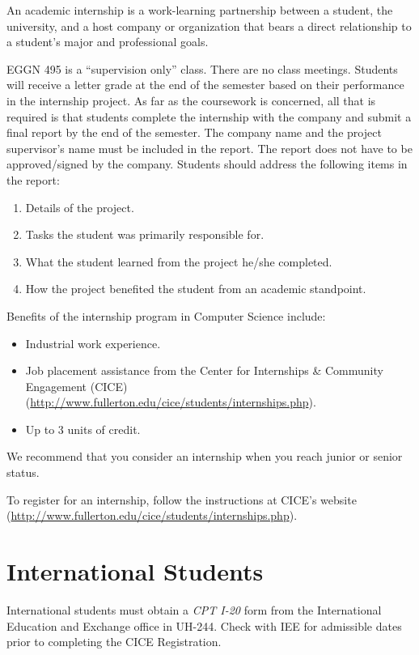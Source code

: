 \documentclass{book}
\begin{document}
An academic internship is a work-learning partnership between a student, the university, and a host company or organization that bears a direct relationship to a student’s major and professional goals.

EGGN 495 is a ``supervision only'' class. There are no class meetings. Students will receive a letter grade at the end of the semester based on their performance in the internship project. As far as the coursework is concerned, all that is required is that students complete the internship with the company and submit a final report by the end of the semester. The company name and the project supervisor's name must be included in the report. The report does not have to be approved/signed by the company. Students should address the following items in the report:
\begin{enumerate}
\item Details of the project.
\item Tasks the student was primarily responsible for.
\item What the student learned from the project he/she completed.
\item How the project benefited the student from an academic standpoint.
\end{enumerate}

Benefits of the internship program in Computer Science include:
\begin{itemize}
\item Industrial work experience.
\item Job placement assistance from the Center for Internships \& Community Engagement (CICE) (\url{http://www.fullerton.edu/cice/students/internships.php}).
\item Up to 3 units of credit.
\end{itemize}

We recommend that you consider an internship when you reach junior or senior status.

To register for an internship, follow the instructions at CICE's website (\url{http://www.fullerton.edu/cice/students/internships.php}).

\section{International Students}

International students must obtain a \emph{CPT I-20} form from the International Education and Exchange office in UH-244. Check with IEE for admissible dates prior to completing the CICE Registration.
\end{document}
